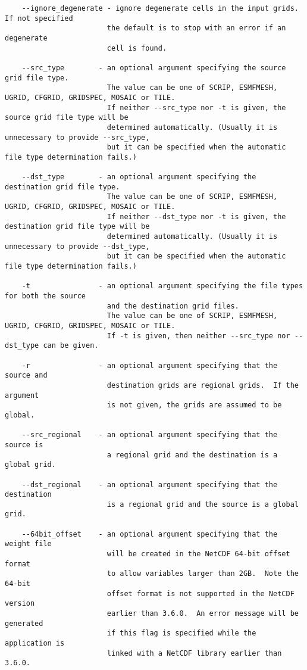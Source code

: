 \begin{verbatim}
    --ignore_degenerate - ignore degenerate cells in the input grids. If not specified
                        the default is to stop with an error if an degenerate
                        cell is found.

    --src_type        - an optional argument specifying the source grid file type.
                        The value can be one of SCRIP, ESMFMESH, UGRID, CFGRID, GRIDSPEC, MOSAIC or TILE.
                        If neither --src_type nor -t is given, the source grid file type will be
                        determined automatically. (Usually it is unnecessary to provide --src_type,
                        but it can be specified when the automatic file type determination fails.)

    --dst_type        - an optional argument specifying the destination grid file type.
                        The value can be one of SCRIP, ESMFMESH, UGRID, CFGRID, GRIDSPEC, MOSAIC or TILE.
                        If neither --dst_type nor -t is given, the destination grid file type will be
                        determined automatically. (Usually it is unnecessary to provide --dst_type,
                        but it can be specified when the automatic file type determination fails.)

    -t                - an optional argument specifying the file types for both the source
                        and the destination grid files.
                        The value can be one of SCRIP, ESMFMESH, UGRID, CFGRID, GRIDSPEC, MOSAIC or TILE.
                        If -t is given, then neither --src_type nor --dst_type can be given.

    -r                - an optional argument specifying that the source and
                        destination grids are regional grids.  If the argument
                        is not given, the grids are assumed to be global.

    --src_regional    - an optional argument specifying that the source is
                        a regional grid and the destination is a global grid.

    --dst_regional    - an optional argument specifying that the destination
                        is a regional grid and the source is a global grid.

    --64bit_offset    - an optional argument specifying that the weight file
                        will be created in the NetCDF 64-bit offset format
                        to allow variables larger than 2GB.  Note the 64-bit
                        offset format is not supported in the NetCDF version
                        earlier than 3.6.0.  An error message will be generated
                        if this flag is specified while the application is
                        linked with a NetCDF library earlier than 3.6.0.


\end{verbatim}
